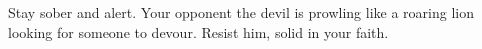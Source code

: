 \lettrine[lines=3]{S}{}tay sober and alert. Your opponent the devil is prowling like a roaring lion looking for someone to devour. Resist him, solid in your faith.
